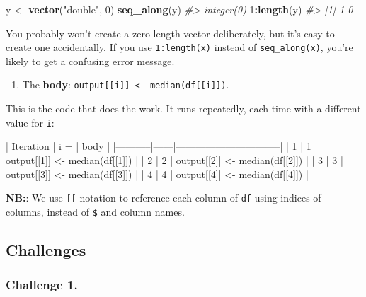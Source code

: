 \documentclass[]{book}
\newenvironment{Shaded}{\begin{snugshade}}{\end{snugshade}}
\newcommand{\CommentTok}[1]{\textcolor[rgb]{0.56,0.35,0.01}{\textit{#1}}}
\newcommand{\DecValTok}[1]{\textcolor[rgb]{0.00,0.00,0.81}{#1}}
\newcommand{\KeywordTok}[1]{\textcolor[rgb]{0.13,0.29,0.53}{\textbf{#1}}}
\newcommand{\NormalTok}[1]{#1}
\newcommand{\OperatorTok}[1]{\textcolor[rgb]{0.81,0.36,0.00}{\textbf{#1}}}
\newcommand{\StringTok}[1]{\textcolor[rgb]{0.31,0.60,0.02}{#1}}
\providecommand{\tightlist}{%
  \setlength{\itemsep}{0pt}\setlength{\parskip}{0pt}}
\begin{document}
\begin{Shaded}
\begin{Highlighting}[]
\NormalTok{y <-}\StringTok{ }\KeywordTok{vector}\NormalTok{(}\StringTok{"double"}\NormalTok{, }\DecValTok{0}\NormalTok{)}
\KeywordTok{seq_along}\NormalTok{(y)}
\CommentTok{#> integer(0)}
\DecValTok{1}\OperatorTok{:}\KeywordTok{length}\NormalTok{(y)}
\CommentTok{#> [1] 1 0}
\end{Highlighting}
\end{Shaded}

You probably won't create a zero-length vector deliberately, but it's easy to create one accidentally. If you use \texttt{1:length(x)} instead of \texttt{seq\_along(x)}, you're likely to get a confusing error message.

\begin{enumerate}
\def\labelenumi{\arabic{enumi}.}
\setcounter{enumi}{2}
\tightlist
\item
  The \textbf{body}: \texttt{output{[}{[}i{]}{]}\ \textless{}-\ median(df{[}{[}i{]}{]})}.
\end{enumerate}

This is the code that does the work. It runs repeatedly, each time with a different value for \texttt{i}:

\begin{Shaded}
\begin{Highlighting}[]
\NormalTok{| Iteration | i =  | body                           |}
\NormalTok{|-----------|------|--------------------------------|}
\NormalTok{| 1         | 1    | output[[1]] <- median(df[[1]]) |}
\NormalTok{| 2         | 2    | output[[2]] <- median(df[[2]]) |}
\NormalTok{| 3         | 3    | output[[3]] <- median(df[[3]]) |}
\NormalTok{| 4         | 4    | output[[4]] <- median(df[[4]]) |}
\end{Highlighting}
\end{Shaded}

\textbf{NB:}: We use \texttt{{[}{[}} notation to reference each column of \texttt{df} using indices of columns, instead of \texttt{\$} and column names.

\hypertarget{challenges-22}{%
\subsection{Challenges}\label{challenges-22}}

\hypertarget{challenge-1.-11}{%
\subsubsection*{Challenge 1.}\label{challenge-1.-11}}
\end{document}
